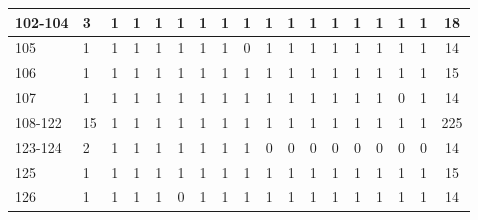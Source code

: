 \begin{table}[htbp]
\begin{center}
{\begin{tabular}{|l|l|c|c|c|c|c|c|c|c|c|c|c|c|c|c|c|c|}
                102-104                                   & 3                                               & 1          & 1          & 1          & 1          & 1          & 1          & 1          & 1          & 1          & 1          & 1          & 1          & 1          & 1          & 1          & 18           \\ \hline
                105                                       & 1                                               & 1          & 1          & 1          & 1          & 1          & 1          & 0          & 1          & 1          & 1          & 1          & 1          & 1          & 1          & 1          & 14           \\ \hline
                106                                       & 1                                               & 1          & 1          & 1          & 1          & 1          & 1          & 1          & 1          & 1          & 1          & 1          & 1          & 1          & 1          & 1          & 15           \\ \hline
                107                                       & 1                                               & 1          & 1          & 1          & 1          & 1          & 1          & 1          & 1          & 1          & 1          & 1          & 1          & 1          & 0          & 1          & 14           \\ \hline
                108-122                                   & 15                                              & 1          & 1          & 1          & 1          & 1          & 1          & 1          & 1          & 1          & 1          & 1          & 1          & 1          & 1          & 1          & 225          \\ \hline
                123-124                                   & 2                                               & 1          & 1          & 1          & 1          & 1          & 1          & 1          & 0          & 0          & 0          & 0          & 0          & 0          & 0          & 0          & 14           \\ \hline
                125                                       & 1                                               & 1          & 1          & 1          & 1          & 1          & 1          & 1          & 1          & 1          & 1          & 1          & 1          & 1          & 1          & 1          & 15           \\ \hline
                126                                       & 1                                               & 1          & 1          & 1          & 0          & 1          & 1          & 1          & 1          & 1          & 1          & 1          & 1          & 1          & 1          & 1          & 14           \\ \hline

\end{tabular}}
\end{center}
\end{table}
